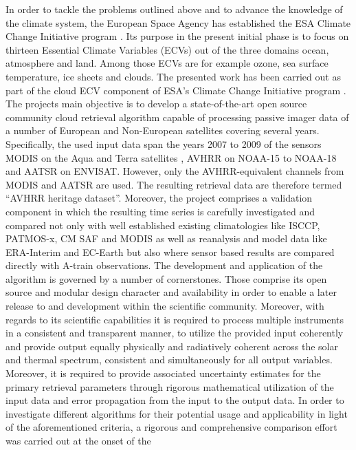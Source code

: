 In order to tackle the problems outlined above and to advance the knowledge of
the climate system, the European Space Agency has established the ESA Climate
Change Initiative program \citep{ESA_CCI_web,Hollmann13}.
Its purpose in the present initial phase is to focus on
thirteen Essential Climate Variables (ECVs) out of the three domains ocean,
atmosphere and land.
Among those ECVs are for example ozone, sea surface
temperature, ice sheets and clouds. 
The presented work has been carried out as part of the cloud ECV component  of
ESA's Climate Change Initiative program \citep{ESA_Cloud_CCI_web}.
The projects main objective is to develop a state-of-the-art open source community
cloud retrieval algorithm capable of processing passive imager data of a
number of European and Non-European satellites covering several years.
Specifically, the used input data span the years 2007 to 2009 of the sensors
MODIS on the Aqua and Terra satellites \citep{King92}, AVHRR on NOAA-15 to
NOAA-18 \citep{Jacobowitz03} and AATSR on ENVISAT.
However, only the AVHRR-equivalent channels from MODIS and AATSR are
used.
The resulting retrieval data are therefore termed ``AVHRR heritage
dataset''. 
Moreover, the project comprises a validation component in which the
resulting time series is carefully investigated and compared not only with
well established existing climatologies like ISCCP, PATMOS-x, CM SAF and MODIS
as well as reanalysis and model data like ERA-Interim and EC-Earth but also
where sensor based results are compared directly with A-train
observations. 
The development and application of the algorithm is governed by a number of
cornerstones.
Those comprise its open source and modular design character and
availability in order to enable a later release to and development within the
scientific community.
Moreover, with regards to its scientific capabilities it
is required to process multiple instruments in a consistent and transparent
manner, to utilize the provided input coherently and provide output equally
physically and radiatively coherent across the solar and thermal spectrum,
consistent and simultaneously for all output variables.
Moreover, it is required to provide associated uncertainty estimates for the
primary retrieval parameters through rigorous mathematical utilization of the
input data and error propagation from the input to the output data.
In order to investigate different algorithms for their potential usage and
applicability in light of the aforementioned criteria, a rigorous and
comprehensive comparison effort was carried out at the onset of the
